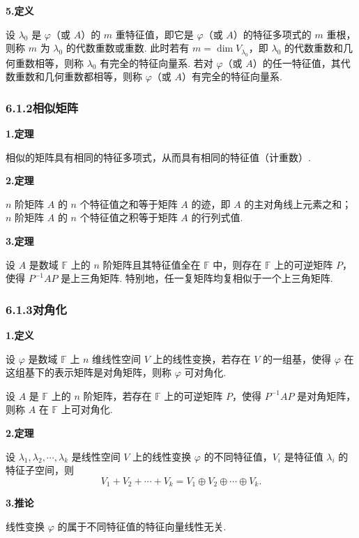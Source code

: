 \documentclass[UTF8, 12pt, fontset=fandol, oneside]{ctexart}
\begin{document}
\noindent\textbf{5.\quad 定义}

设 $\lambda_0$ 是 $\varphi$（或 $A$）的 $m$ 重特征值，即它是 $\varphi$（或 $A$）的特征多项式的 $m$ 重根，则称 $m$ 为 $\lambda_0$ 的代数重数或重数. 此时若有 $m=\dim V_{\lambda_0}$，即 $\lambda_0$ 的代数重数和几何重数相等，则称 $\lambda_0$ 有完全的特征向量系. 若对 $\varphi$（或 $A$）的任一特征值，其代数重数和几何重数都相等，则称 $\varphi$（或 $A$）有完全的特征向量系.

\subsubsection*{6.1.2\quad 相似矩阵}

\noindent\textbf{1.\quad 定理}

相似的矩阵具有相同的特征多项式，从而具有相同的特征值（计重数）.

\noindent\textbf{2.\quad 定理}

$n$ 阶矩阵 $A$ 的 $n$ 个特征值之和等于矩阵 $A$ 的迹，即 $A$ 的主对角线上元素之和；$n$ 阶矩阵 $A$ 的 $n$ 个特征值之积等于矩阵 $A$ 的行列式值.

\noindent\textbf{3.\quad 定理}

设 $A$ 是数域 $\mathbb{F}$ 上的 $n$ 阶矩阵且其特征值全在 $\mathbb{F}$ 中，则存在 $\mathbb{F}$ 上的可逆矩阵 $P$，使得 $P^{-1}AP$ 是上三角矩阵. 特别地，任一复矩阵均复相似于一个上三角矩阵.

\subsubsection*{6.1.3\quad 对角化}

\noindent\textbf{1.\quad 定义}

设 $\varphi$ 是数域 $\mathbb{F}$ 上 $n$ 维线性空间 $V$ 上的线性变换，若存在 $V$ 的一组基，使得 $\varphi$ 在这组基下的表示矩阵是对角矩阵，则称 $\varphi$ 可对角化.

设 $A$ 是 $\mathbb{F}$ 上的 $n$ 阶矩阵，若存在 $\mathbb{F}$ 上的可逆矩阵 $P$，使得 $P^{-1}AP$ 是对角矩阵，则称 $A$ 在 $\mathbb{F}$ 上可对角化.

\noindent\textbf{2.\quad 定理}

设 $\lambda_1,\lambda_2,\cdots,\lambda_k$ 是线性空间 $V$ 上的线性变换 $\varphi$ 的不同特征值，$V_i$ 是特征值 $\lambda_i$ 的特征子空间，则
\[
V_1+V_2+\cdots+V_k=V_1\oplus V_2\oplus\cdots\oplus V_k.
\]

\noindent\textbf{3.\quad 推论}

线性变换 $\varphi$ 的属于不同特征值的特征向量线性无关.
\end{document}

